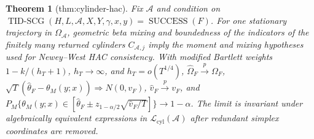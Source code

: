 \documentclass{article}
\newtheorem{theorem}{Theorem}
\begin{document}
\begin{theorem}[thm:cylinder-hac]\label{thm:cylinder-hac}
Fix \(\mathcal A\) and condition on \(\operatorname{TID\text{-}SCG}(H,L,\mathcal A,X,Y,\gamma,x,y)=\operatorname{SUCCESS}(F)\). For one stationary trajectory in \(\Omega_{\mathcal A}\), geometric beta mixing and boundedness of the indicators of the finitely many returned cylinders \(C_{\mathcal A,j}\) imply the moment and mixing hypotheses used for Newey--West HAC consistency. With modified Bartlett weights \(1-k/(h_T+1)\), \(h_T\to\infty\), and \(h_T=o(T^{1/4})\), \(\widehat\Omega_F\overset p\to\Omega_F\), \(\sqrt T(\widehat\theta_F-\theta_M(y;x))\Rightarrow N(0,v_F)\), \(\widehat v_F\overset p\to v_F\), and \(P_M\{\theta_M(y;x)\in[\widehat\theta_F\pm z_{1-\alpha/2}\sqrt{\widehat v_F/T}]\}\to1-\alpha\). The limit is invariant under algebraically equivalent expressions in \(\mathcal L_{\mathrm{cyl}}(\mathcal A)\) after redundant simplex coordinates are removed.
\end{theorem}
\end{document}
